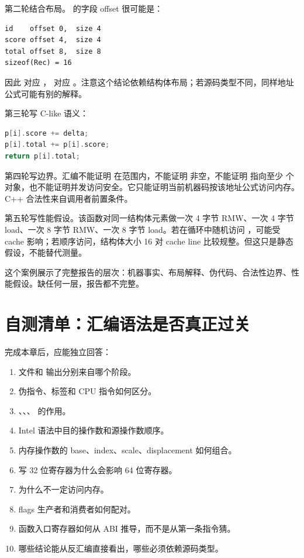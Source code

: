 第二轮结合布局。  的字段 offset 很可能是：

\begin{lstlisting}
id    offset 0,  size 4
score offset 4,  size 4
total offset 8,  size 8
sizeof(Rec) = 16
\end{lstlisting}

因此  对应 ， 对应 。注意这个结论依赖结构体布局；若源码类型不同，同样地址公式可能有别的解释。

第三轮写 C-like 语义：

\begin{lstlisting}[language=C++]
p[i].score += delta;
p[i].total += p[i].score;
return p[i].total;
\end{lstlisting}

第四轮写边界。汇编不能证明  在范围内，不能证明  非空，不能证明  指向至少  个对象，也不能证明并发访问安全。它只能证明当前机器码按该地址公式访问内存。C++ 合法性来自调用者前置条件。

第五轮写性能假设。该函数对同一结构体元素做一次 4 字节 RMW、一次 4 字节 load、一次 8 字节 RMW、一次 8 字节 load。若在循环中随机访问 ，可能受 cache 影响；若顺序访问，结构体大小 16 对 cache line 比较规整。但这只是静态假设，不能替代测量。

这个案例展示了完整报告的层次：机器事实、布局解释、伪代码、合法性边界、性能假设。缺任何一层，报告都不完整。

\section{自测清单：汇编语法是否真正过关}

完成本章后，应能独立回答：

\begin{enumerate}
  \item {} 文件和  输出分别来自哪个阶段。
  \item 伪指令、标签和 CPU 指令如何区分。
  \item {}、、、 的作用。
  \item Intel 语法中目的操作数和源操作数顺序。
  \item 内存操作数的 base、index、scale、displacement 如何组合。
  \item 写 32 位寄存器为什么会影响 64 位寄存器。
  \item {} 为什么不一定访问内存。
  \item flags 生产者和消费者如何配对。
  \item 函数入口寄存器如何从 ABI 推导，而不是从第一条指令猜。
  \item 哪些结论能从反汇编直接看出，哪些必须依赖源码类型。
\end{enumerate}

